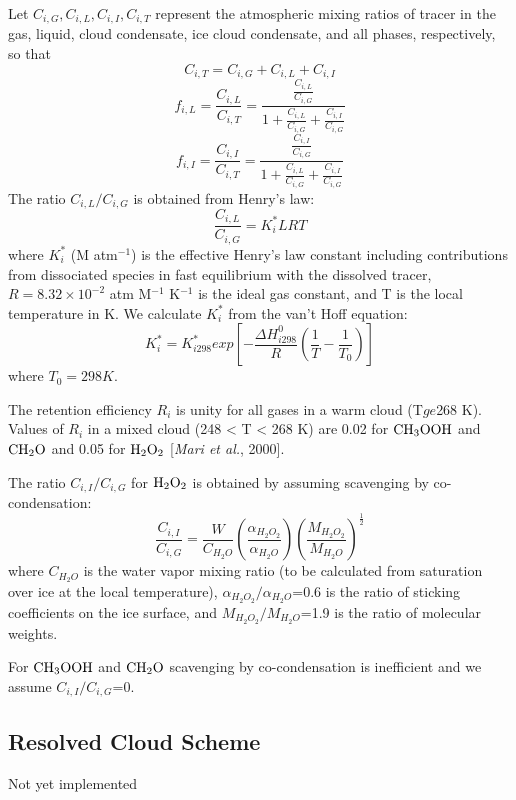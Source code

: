Let $C_{i,G}, C_{i,L}, C_{i,I}, C_{i,T}$ represent the atmospheric mixing 
ratios of tracer in the gas, liquid, cloud condensate, ice cloud condensate, 
and all phases, respectively, so that 
$$
 C_{i,T} = C_{i,G} + C_{i,L} + C_{i,I}
$$
$$
f_{i,L} = \frac{C_{i,L}}{C_{i,T}} = \frac{\frac{C_{i,L}}{C_{i,G}}}{1 + \frac{C_{i,L}}{C_{i,G}} + \frac{C_{i,I}}{C_{i,G}}}
$$
$$
f_{i,I} = \frac{C_{i,I}}{C_{i,T}} = \frac{\frac{C_{i,I}}{C_{i,G}}}{1 + \frac{C_{i,L}}{C_{i,G}} + \frac{C_{i,I}}{C_{i,G}}}
$$
The ratio $C_{i,L}/C_{i,G}$ is obtained from Henry's law:
$$
\frac{C_{i,L}}{C_{i,G}} = K_i^* LRT
$$
where $K_i^*$ (M atm$^{-1}$) is the effective Henry's law constant including 
contributions from dissociated species in fast equilibrium with the dissolved 
tracer, $R = 8.32\times 10^{-2}$ atm M$^{-1}$ K$^{-1}$ is the ideal gas constant, and T is the local temperature in K. We calculate $K_i^*$ from the van't Hoff
equation: 
$$
K_i^* = K_{i 298}^* exp\left[ -\frac{\Delta H^0_{i 298}}{R}\left(\frac{1}{T} - \frac{1}{T_0} \right) \right]
$$
where $T_0 = 298 K$. 

The retention efficiency $R_i$ is unity for all gases in a warm cloud (T$ge$268 K). Values of $R_i$ in a mixed cloud (248 < T < 268 K) are 0.02 for $\rm CH_3OOH$ and $\rm CH_2O$ and 0.05 for $\rm H_2O_2$ [{\it Mari et al.}, 2000]. 

The ratio $C_{i,I}/C_{i,G}$ for $\rm H_2O_2$ is obtained by assuming scavenging
by co-condensation: 
$$
\frac{C_{i,I}}{C_{i,G}}=
\frac{W}{C_{H_2O}}
\left( \frac{\alpha_{H_2O_2}}{\alpha_{H_2O}} \right) 
\left( \frac{M_{H_2O_2}}{M_{H_2O}} \right) ^{\frac{1}{2}}
$$
where $C_{H_2O}$ is the water vapor mixing ratio (to be calculated from 
saturation over ice at the local temperature), $\alpha_{H_2O_2}/\alpha_{H_2O}$=0.6 is the ratio of sticking coefficients on the ice surface, and $M_{H_2O_2}/M_{H_2O}$=1.9 is the ratio of molecular weights. 

For $\rm CH_3OOH$ and $\rm CH_2O$ scavenging by co-condensation is inefficient
and we assume $C_{i,I}/C_{i,G}$=0.
\subsection{Resolved Cloud Scheme}
Not yet implemented

%
%
